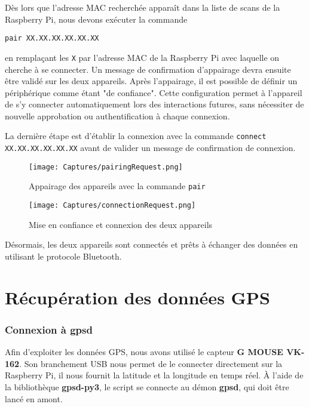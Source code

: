\documentclass[a4paper,11pt]{article}
\begin{document}
Dès lors que l'adresse MAC recherchée apparaît dans la liste de scans de la Raspberry Pi, nous devons exécuter la commande 
\begin{center}
    \texttt{pair XX.XX.XX.XX.XX.XX} 
\end{center}

en remplaçant les \texttt{X} par l'adresse MAC de la Raspberry Pi avec laquelle on cherche à se connecter. Un message de confirmation d'appairage devra ensuite être validé sur les deux appareils. Après l’appairage, il est possible de définir un périphérique comme étant "de confiance". Cette configuration permet à l’appareil de s’y connecter automatiquement lors des interactions futures, sans nécessiter de nouvelle approbation ou authentification à chaque connexion. 

\quad 

La dernière étape est d'établir la connexion avec la commande \texttt{connect XX.XX.XX.XX.XX.XX} avant de valider un message de confirmation de connexion.

\begin{figure}[H]
    \centering
    \texttt{[image: Captures/pairingRequest.png]}
    \caption{Appairage des appareils avec la commande \texttt{pair}}
    \label{fig:enter-label}
\end{figure}

\begin{figure}[H]
    \centering
    \texttt{[image: Captures/connectionRequest.png]}
    \caption{Mise en confiance et connexion des deux appareils}
    \label{fig:enter-label}
\end{figure}

Désormais, les deux appareils sont connectés et prêts à échanger des données en utilisant le protocole Bluetooth.

\newpage

\section{Récupération des données GPS}

\subsubsection{Connexion à gpsd}
Afin d'exploiter les données GPS, nous avons utilisé le capteur \textbf{G MOUSE VK-162}. Son branchement USB nous permet de le connecter directement sur la Raspberry Pi, il nous fournit la latitude et la longitude en temps réel. À l'aide de la bibliothèque \textbf{gpsd-py3}, le script se connecte au démon \textbf{gpsd}, qui doit être lancé en amont.
\end{document}
